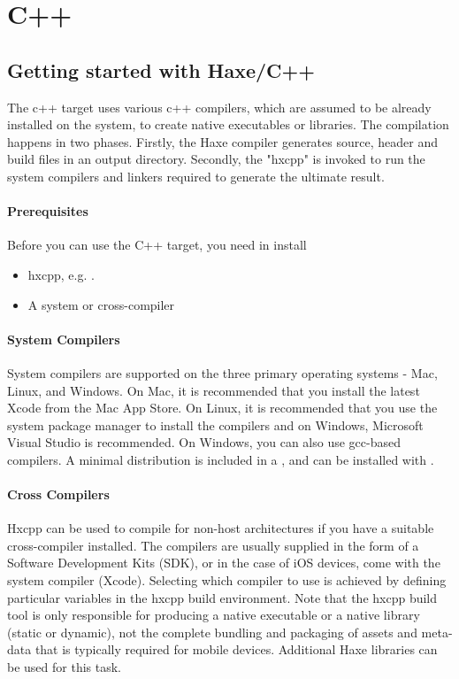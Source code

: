 \section{C++}
\label{target-cpp}

\subsection{Getting started with Haxe/C++}
\label{target-cpp-getting-started}
The c++ target uses various c++ compilers, which are assumed to be already installed on the system, to create native executables or libraries.  The compilation happens in two phases.  Firstly, the Haxe compiler generates source, header and build files in an output directory.  Secondly, the "hxcpp"  is invoked to run the system compilers and linkers required to generate the ultimate result.

\paragraph{Prerequisites}
Before you can use the C++ target, you need in install
\begin{itemize}
	\item hxcpp, e.g. .
	\item A system or cross-compiler
\end{itemize}

\paragraph{System Compilers}
System compilers are supported on the three primary operating systems - Mac, Linux, and Windows.  On Mac, it is recommended that you install the latest Xcode from the Mac App Store.  On Linux, it is recommended that you use the system package manager to install the compilers and on Windows, Microsoft Visual Studio is recommended.  On Windows, you can also use gcc-based compilers.  A minimal distribution is included in a , and can be installed with .

\paragraph{Cross Compilers}
Hxcpp can be used to compile for non-host architectures if you have a suitable cross-compiler installed.  The compilers are usually supplied in the form of a Software Development Kits (SDK), or in the case of iOS devices, come with the system compiler (Xcode).  Selecting which compiler to use is achieved by defining particular variables in the hxcpp build environment.  Note that the hxcpp build tool is only responsible for producing a native executable or a native library (static or dynamic), not the complete bundling and packaging of assets and meta-data that is typically required for mobile devices.  Additional Haxe libraries can be used for this task.

